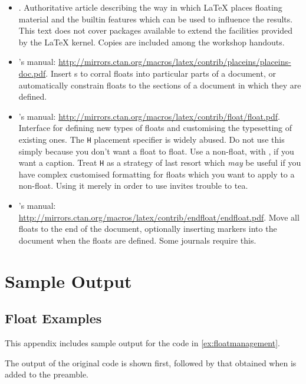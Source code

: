 \begin{itemize}
  \item {}.
  Authoritative article describing the way in which \LaTeX{} places floating material and the builtin features which can be used to influence the results.
  This text does not cover packages available to extend the facilities provided by the \LaTeX{} kernel.
  Copies are included among the workshop handouts.
  \item {}'s manual: \url{http://mirrors.ctan.org/macros/latex/contrib/placeins/placeins-doc.pdf}.
  Insert s to corral floats into particular parts of a document, or automatically constrain floats to the sections of a document in which they are defined.
  \item {}'s manual: \url{http://mirrors.ctan.org/macros/latex/contrib/float/float.pdf}.
  Interface for defining new types of floats and customising the typesetting of existing ones.
  The \verb|H| placement specifier is widely abused.
  Do not use this simply because you don't want a float to float.
  Use a non-float, with , if you want a caption.
  Treat \verb|H| as a strategy of last resort which \emph{may} be useful if you have complex customised formatting for floats which you want to apply to a non-float.
  Using it merely in order to use  invites trouble to tea.
  \item {}'s manual: \url{http://mirrors.ctan.org/macros/latex/contrib/endfloat/endfloat.pdf}.
  Move all floats to the end of the document, optionally inserting markers into the document when the floats are defined.
  Some journals require this.
\end{itemize}


\section<1-| beamer:0>{Sample Output}\label{sec:samples}

\subsection<1-| beamer:0>{Float Examples}\label{subsec:samples-floats}
This appendix includes sample output for the code in \cref{ex:floatmanagement}.

The output of the original code is shown first, followed by that obtained when  is added to the preamble.



